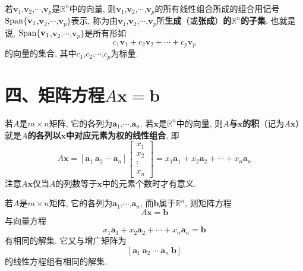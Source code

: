\\[4ex]

\begin{definition}
若$\mathbf{v}_1$,$\mathbf{v}_2$,$\cdots$,$\mathbf{v}_p$是$\mathbb{R}^n$中的向量, 则$\mathbf{v}_1$,$\mathbf{v}_2$,$\cdots$,$\mathbf{v}_p$的所有线性组合所成的组合用记号$\operatorname{Span}\{\mathbf{v}_1$,$\mathbf{v}_2$,$\cdots$,$\mathbf{v}_p\}$表示, 称为由$\mathbf{v}_1$,$\mathbf{v}_2$,$\cdots$,$\mathbf{v}_p$所\textbf{生成}（或\textbf{张成}）\textbf{的$\mathbb{R}^n$的子集}. 也就是说, $\operatorname{Span}\{\mathbf{v}_1$,$\mathbf{v}_2$,$\cdots$,$\mathbf{v}_p\}$是所有形如
	\[c_1\mathbf{v}_1+c_2\mathbf{v}_2+\cdots+c_p\mathbf{v}_p\]
的向量的集合, 其中$c_1$,$c_2$,$\cdots$,$c_p$为标量.\\[2ex]
\end{definition}\vspace{4ex}

\section{四、矩阵方程$A\mathbf{x}=\mathbf{b}$}
\begin{definition}
若$A$是$m\times n$矩阵, 它的各列为$\bm{a}_1$,$\cdots$,$\bm{a}_n$. 若$\bm{x}$是$\mathbb{R}^n$中的向量, 则\textbf{$A$与$\bm{x}$的积}（记为$A\bm{x}$）就是\textbf{$A$的各列以$\bm{x}$中对应元素为权的线性组合}, 即
	\[A\bm{x}=[\bm{a}_1\ \bm{a}_2\ \cdots\ \bm{a}_n]\left[\begin{array}{c}x_1\\x_2\\\vdots\\x_n\end{array}\right]=x_1\bm{a}_1+x_2\bm{a}_2+\cdots+x_n\bm{a}_n\]
注意$A\bm{x}$仅当$A$的列数等于$\bm{x}$中的元素个数时才有意义.\\[2ex]
\end{definition}

\begin{theorem}
若$A$是$m\times n$矩阵, 它的各列为$\bm{a}_1$,$\cdots$,$\bm{a}_n$, 而$\bm{b}$属于$\mathbb{R}^n$, 则矩阵方程
\[A\bm{x}=\bm{b}\]
与向量方程
\[x_1\bm{a}_1+x_2\bm{a}_2+\cdots+x_n\bm{a}_n=\bm{b}\]
有相同的解集. 它又与增广矩阵为
\[[\bm{a}_1\ \bm{a}_2\ \cdots\ \bm{a}_n\ \bm{b}]\]
的线性方程组有相同的解集.\\[2ex]
\end{theorem}\vspace{2ex}

